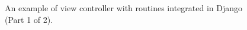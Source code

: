 \begin{figure}[H]
	\centering
	\caption{An example of view controller with routines integrated in Django (Part 1 of 2).}
	\label{fig:dvc_1}
\end{figure}
